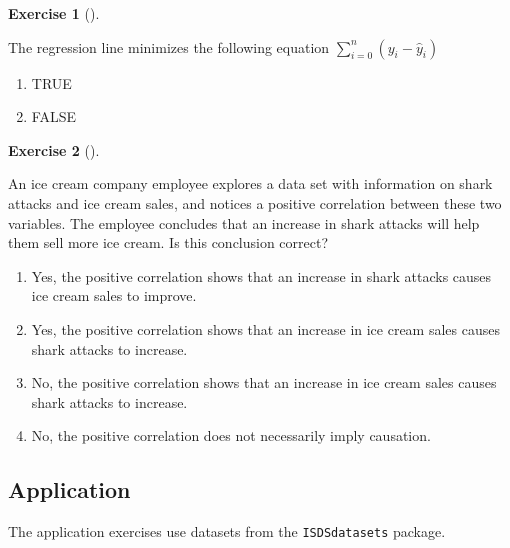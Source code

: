 \documentclass[
  letterpaper,
  DIV=11,
  numbers=noendperiod]{scrreprt}
\providecommand{\tightlist}{%
  \setlength{\itemsep}{0pt}\setlength{\parskip}{0pt}}\usepackage{longtable,booktabs,array}
\theoremstyle{definition}
\newtheorem{exercise}{Exercise}[chapter]
\theoremstyle{remark}
\begin{document}
\leavevmode{}%
\begin{exercise}[]\label{exr-ch05-c10}

The regression line minimizes the following equation
\(\sum_{i=0}^{n}(y_i-\hat{y}_i)\)

\begin{enumerate}
\def\labelenumi{\alph{enumi})}
\tightlist
\item
  TRUE
\item
  FALSE
\end{enumerate}

\end{exercise}

\leavevmode{}%
\begin{exercise}[]\label{exr-ch05-c11}

An ice cream company employee explores a data set with information on
shark attacks and ice cream sales, and notices a positive correlation
between these two variables. The employee concludes that an increase in
shark attacks will help them sell more ice cream. Is this conclusion
correct?

\begin{enumerate}
\def\labelenumi{\alph{enumi})}
\tightlist
\item
  Yes, the positive correlation shows that an increase in shark attacks
  causes ice cream sales to improve.
\item
  Yes, the positive correlation shows that an increase in ice cream
  sales causes shark attacks to increase.
\item
  No, the positive correlation shows that an increase in ice cream sales
  causes shark attacks to increase.
\item
  No, the positive correlation does not necessarily imply causation.
\end{enumerate}

\end{exercise}

\hypertarget{sec-ex05-application}{%
\subsection{Application}\label{sec-ex05-application}}

The application exercises use datasets from the \texttt{ISDSdatasets}
package.
\end{document}
